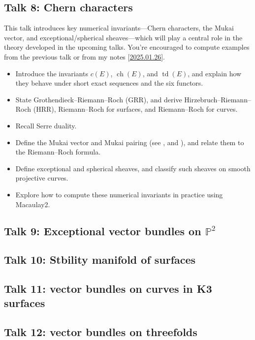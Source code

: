 \documentclass[UTF8]{amsart}
\numberwithin{equation}{section}
\theoremstyle{plain}
\numberwithin{equation}{section}
\theoremstyle{remark}
\DeclareMathOperator{\ch}{\operatorname{ch}}
\DeclareMathOperator{\td}{\operatorname{td}}
\begin{document}
\subsection*{Talk 8: Chern characters}
This talk introduces key numerical invariants—Chern characters, the Mukai vector, and exceptional/spherical sheaves—which will play a central role in the theory developed in the upcoming talks. You're encouraged to compute examples from the previous talk or from my notes [\href{https://github.com/ramified/personal_handwritten_collection/raw/main/weeklyupdate/2025/2025.01.26_Numerical_Chern_class.pdf}{2025.01.26}].

\begin{itemize}
\item Introduce the invariants $c(E)$, $\ch(E)$, and $\td(E)$, and explain how they behave under short exact sequences and the six functors.
\item State Grothendieck–Riemann--Roch (GRR), and derive Hirzebruch--Riemann–Roch (HRR), Riemann--Roch for surfaces, and Riemann--Roch for curves.
\item Recall Serre duality.
\item Define the Mukai vector and Mukai pairing (see \cite[p133, p172]{Huy06}, \cite[p40]{MS19} and \cite[p6]{Bay16}), and relate them to the Riemann–Roch formula.
\item Define exceptional and spherical sheaves, and classify such sheaves on smooth projective curves.
\item Explore how to compute these numerical invariants in practice using Macaulay2.
\end{itemize}

\subsection*{Talk 9: Exceptional vector bundles on $\mathbb{P}^2$}

\subsection*{Talk 10: Stbility manifold of surfaces}

\subsection*{Talk 11: vector bundles on curves in K3 surfaces}

\subsection*{Talk 12: vector bundles on threefolds}



\end{document}
